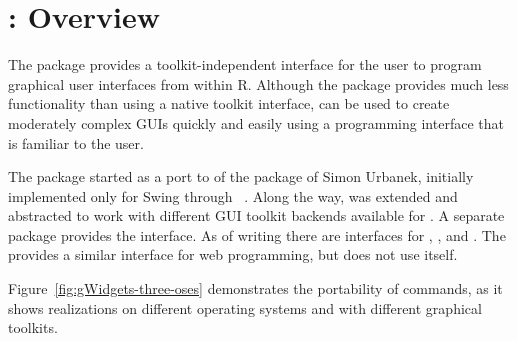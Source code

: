 






 
\newcommand{\ONLYIN}[1]{[only in #1]}

\chapter{: Overview}
\label{sec:overview}




The  package provides a toolkit-independent interface
for the \R\/ user to program graphical user interfaces from within
R. Although the package provides much less functionality than using a
native toolkit interface,  can be used to create
moderately complex GUIs quickly and easily using a programming
interface that is familiar to the \R\/ user.

The  package started as a port to  of the
 package of Simon Urbanek, initially implemented only
for Swing through ~\citep{iWidgets}. Along the way,
 was extended and abstracted to work with different GUI
toolkit backends available for \R. A separate package provides the
interface. As of writing there are interfaces for ,
, and . The  provides a
similar interface for web programming, but does not use 
itself.

Figure~\ref{fig:gWidgets-three-oses} demonstrates the portability of
 commands, as it shows realizations on different
operating systems and with different graphical toolkits.

